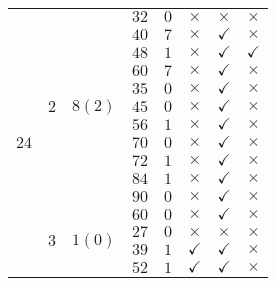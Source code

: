 \documentclass[12pt,a4paper,halfparskip,headsepline,bibtotocnumbered]{scrreprt}
\theoremstyle{nummermitklammern}
\theoremstyle{nonumberbreak}
\begin{document}
\begin{table}[H]
\begin{tabular}{|c|c|c|c|c|c|c|c|}
		\multirow{15}{*}{$24$}	&\multirow{11}{*}{$2$}	&\multirow{11}{*}{$8(2)$}	&$32$	&$0$	&$\times$		&$\times$		&$\times$\\ \cline{4-8}
								&						&							&$40$	&$7$	&$\times$		&$\checkmark$	&$\times$\\ \cline{4-8}
								&						&							&$48$	&$1$	&$\times$		&$\checkmark$	&$\checkmark$\\ \cline{4-8}
								&						&							&$60$	&$7$	&$\times$		&$\checkmark$	&$\times$\\ \cline{4-8}
								&						&							&$35$	&$0$	&$\times$		&$\checkmark$	&$\times$\\ \cline{4-8}
								&						&							&$45$	&$0$	&$\times$		&$\checkmark$	&$\times$\\ \cline{4-8}
								&						&							&$56$	&$1$	&$\times$		&$\checkmark$	&$\times$\\ \cline{4-8}
								&						&							&$70$	&$0$	&$\times$		&$\checkmark$	&$\times$\\ \cline{4-8}
								&						&							&$72$	&$1$	&$\times$		&$\checkmark$	&$\times$\\ \cline{4-8}
								&						&							&$84$	&$1$	&$\times$		&$\checkmark$	&$\times$\\ \cline{4-8}
								&						&							&$90$	&$0$	&$\times$		&$\checkmark$	&$\times$\\ \cline{2-8}
								&\multirow{4}{*}{$3$}	&\multirow{4}{*}{$1(0)$}	&$60$	&$0$	&$\times$		&$\checkmark$	&$\times$\\ \cline{4-8}
								&						&							&$27$	&$0$	&$\times$		&$\times$		&$\times$\\ \cline{4-8}
								&						&							&$39$	&$1$	&$\checkmark$	&$\checkmark$	&$\times$\\ \cline{4-8}
								&						&							&$52$	&$1$	&$\checkmark$	&$\checkmark$	&$\times$\\ \hline
	\end{tabular}
\end{table}
\end{document}
